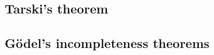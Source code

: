 \documentclass[11pt,a4paper]{article}
\begin{document}
\subsection{Tarski's theorem}

\subsection{Gödel's incompleteness theorems}

{\raggedright%
\printbibliography[heading=bibintoc]%
}
\end{document}
